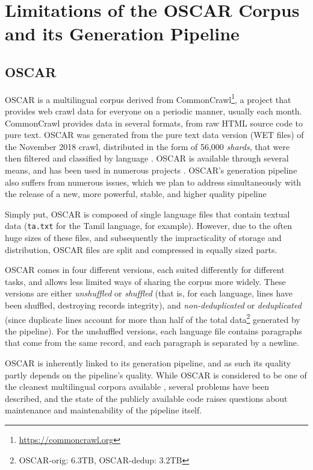 \section{Limitations of the OSCAR Corpus and its Generation Pipeline}

\subsection{OSCAR}

OSCAR is a multilingual corpus derived from CommonCrawl\footnote{\url{https://commoncrawl.org}}, a project that provides web crawl data for everyone on a periodic manner, usually each month. CommonCrawl provides data in several formats, from raw HTML source code to pure text. OSCAR was generated from the pure text data version (WET files) of the November 2018 crawl, distributed in the form of 56,000 \emph{shards}, that were then filtered and classified by language \citep{ortiz-suarez-etal-2019-asynchronous,ortiz-suarez-etal-2020-monolingual}. OSCAR is available through several means, and has been used in numerous projects \citep{ortiz-suarez-etal-2019-asynchronous}. OSCAR's generation pipeline also suffers from numerous issues, which we plan to address simultaneously with the release of a new, more powerful, stable, and higher quality pipeline

Simply put, OSCAR is composed of single language files that contain textual data (\texttt{ta.txt} for the Tamil language, for example). However, due to the often huge sizes of these files, and subsequently the impracticality of storage and distribution, OSCAR files are split and compressed in equally sized parts.

OSCAR comes in four different versions, each suited differently for different tasks, and allows less limited ways of sharing the corpus more widely. These versions are either \emph{unshuffled} or \emph{shuffled} (that is, for each language, lines have been shuffled, destroying records integrity), and \emph{non-deduplicated} or \emph{deduplicated} (since duplicate lines account for more than half of the total data\footnote{OSCAR-orig: 6.3TB, OSCAR-dedup: 3.2TB} generated by the pipeline).
For the unshuffled versions, each language file contains paragraphs that come from the same record, and each paragraph is separated by a newline.

OSCAR is inherently linked to its generation pipeline, and as such its quality partly depends on the pipeline's quality. While OSCAR is considered to be one of the cleanest multilingual corpora available \citep{caswell-etal-2020-language,caswell-etal-2021-quality}, several problems have been described, and the state of the publicly available code raises questions about maintenance and maintenability of the pipeline itself.

